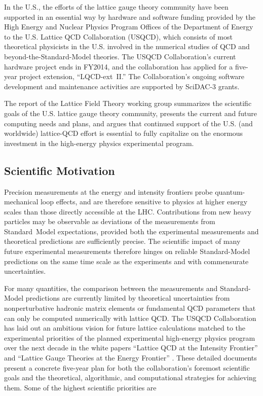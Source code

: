 In the U.S., the efforts of the lattice gauge theory community have been
supported in an essential way by hardware and software funding provided by the
High Energy and Nuclear Physics Program Offices of the Department of Energy to
the U.S. Lattice QCD Collaboration (USQCD), which consists of most theoretical
physicists in the U.S. involved in the numerical studies of QCD and
beyond-the-Standard-Model theories.  The USQCD Collaboration's current
hardware project ends in FY2014, and the collaboration has applied for a
five-year project extension, ``LQCD-ext~II.''  The Collaboration's ongoing
software development and maintenance activities are supported by SciDAC-3
grants.

The report of the Lattice Field Theory working group summarizes the scientific
goals of the U.S. lattice gauge theory community, presents the current and
future computing needs and plans, and argues that continued support of the
U.S. (and worldwide) lattice-QCD effort is essential to fully capitalize on
the enormous investment in the high-energy physics experimental program.

\subsection{Scientific Motivation}

Precision measurements at the energy and intensity frontiers probe
quantum-mechanical loop effects, and are therefore sensitive to physics at
higher energy scales than those directly accessible at the LHC.  Contributions
from new heavy particles may be observable as deviations of the measurements
from Standard~Model expectations, provided both the experimental measurements
and theoretical predictions are sufficiently precise.  The scientific impact
of many future experimental measurements therefore hinges on reliable
Standard-Model predictions on the same time scale as the experiments and with
commensurate uncertainties.

For many quantities, the comparison between the measurements and
Standard-Model predictions are currently limited by theoretical uncertainties
from nonperturbative hadronic matrix elements or fundamental QCD parameters
that can only be computed numerically with lattice QCD.  The USQCD
Collaboration has laid out an ambitious vision for future lattice calculations
matched to the experimental priorities of the planned experimental high-energy
physics program over the next decade in the white papers ``Lattice QCD at the
Intensity Frontier'' and ``Lattice Gauge Theories at the Energy Frontier''
\cite{USQCD_IF_whitepaper13,USQCD_EF_whitepaper13}.  These detailed documents
present a concrete five-year plan for both the collaboration's foremost
scientific goals and the theoretical, algorithmic, and computational
strategies for achieving them.  Some of the highest scientific priorities are


